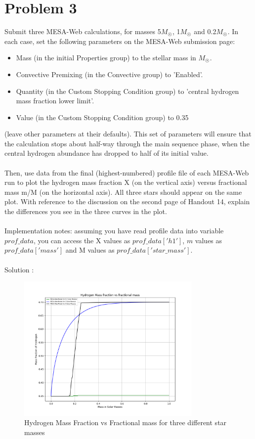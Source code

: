 \documentclass[10pt]{article}
\begin{document}
\section*{Problem 3}
Submit three MESA-Web calculations, for masses 5$M_{\astrosun}$, 1$M_{\astrosun}$ and 0.2$M_{\astrosun}$. In each case, set the following parameters on the MESA-Web submission page:
\begin{itemize}
    \item Mass (in the initial Properties group) to the stellar mass in $M_{\astrosun}$.

    \item Convective Premixing (in the Convective group) to 'Enabled'.

    \item Quantity (in the Custom Stopping Condition group) to 'central hydrogen mass fraction lower limit'.

    \item Value (in the Custom Stopping Condition group) to 0.35
\end{itemize}
(leave other parameters at their defaults). This set of parameters will ensure that the calculation stops about half-way through the main sequence phase, when the central hydrogen abundance has dropped to half of its initial value.\\ \\
Then, use data from the final (highest-numbered) profile file of each MESA-Web run to plot the hydrogen mass fraction X (on the vertical axis) versus fractional mass m/M (on the horizontal axis). All three stars should appear on the same plot. With reference to the discussion on the second page of Handout 14, explain the differences you see in the three curves in the plot.\\ \\
Implementation notes: assuming you have read profile data into variable $prof\_data$, you can access the X values as $prof\_data['h1']$, $m$ values as $prof\_data['mass']$ and M values as $prof\_data['star\_mass']$. \\ \\
Solution :
\begin{figure}[H]
    \centering
    \includegraphics[width=0.8\textwidth]{hw_9_astron_310_q3.png}
    \caption{Hydrogen Mass Fraction vs Fractional mass for three different star masses}
    \label{fig:enter-label}
\end{figure}
\end{document}
